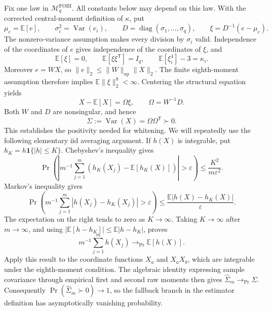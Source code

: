 Fix one law in \(\mathcal M_q^{\mathrm{FOBI}}\). All constants below may depend on this law. With the corrected central-moment definition of \(\kappa\), put
\[
 \mu_e=\mathbb E[e],
 \qquad
 \sigma_i^2=\operatorname{Var}(e_i),
 \qquad
 D=\operatorname{diag}(\sigma_1,\ldots,\sigma_q),
 \qquad
 \xi=D^{-1}(e-\mu_e).
\]
The nonzero-variance assumption makes every division by \(\sigma_i\) valid. Independence of the coordinates of \(e\) gives independence of the coordinates of \(\xi\), and
\[
 \mathbb E[\xi]=0,
 \qquad
 \mathbb E[\xi\xi^{\mathsf T}]=I_q,
 \qquad
 \mathbb E[\xi_i^4]-3=\kappa_i.
\]
Moreover \(e=WX\), so \(\|e\|_2\leq\|W\|_{\mathrm{op}}\|X\|_2\). The finite eighth-moment assumption therefore implies \(\mathbb E\|\xi\|_2^8<\infty\). Centering the structural equation yields
\[
 X-\mathbb E[X]=\Omega\xi,
 \qquad
 \Omega=W^{-1}D.
\]
Both \(W\) and \(D\) are nonsingular, and hence
\[
 \Sigma:=\operatorname{Var}(X)=\Omega\Omega^{\mathsf T}\succ0.
\]
This establishes the positivity needed for whitening. We will repeatedly use the following elementary iid averaging argument. If \(h(X)\) is integrable, put \(h_K=h\mathbf 1\{|h|\leq K\}\). Chebyshev's inequality gives
\[
 \Pr\!\left(
  \left|m^{-1}\sum_{j=1}^m(h_K(X_j)-\mathbb E[h_K(X)])\right|>\varepsilon
 \right)
 \leq\frac{K^2}{m\varepsilon^2}.
\]
Markov's inequality gives
\[
 \Pr\!\left(
  m^{-1}\sum_{j=1}^m|h(X_j)-h_K(X_j)|>\varepsilon
 \right)
 \leq\frac{\mathbb E|h(X)-h_K(X)|}{\varepsilon}.
\]
The expectation on the right tends to zero as \(K\to\infty\). Taking \(K\to\infty\) after \(m\to\infty\), and using \(|\mathbb E[h-h_K]|\leq\mathbb E|h-h_K|\), proves
\[
 m^{-1}\sum_{j=1}^m h(X_j)\longrightarrow_{\Pr}\mathbb E[h(X)].
\]
Apply this result to the coordinate functions \(X_a\) and \(X_aX_b\), which are integrable under the eighth-moment condition. The algebraic identity expressing sample covariance through empirical first and second raw moments then gives \(\widehat\Sigma_m\to_{\Pr}\Sigma\). Consequently \(\Pr(\widehat\Sigma_m\succ0)\to1\), so the fallback branch in the estimator definition has asymptotically vanishing probability.

